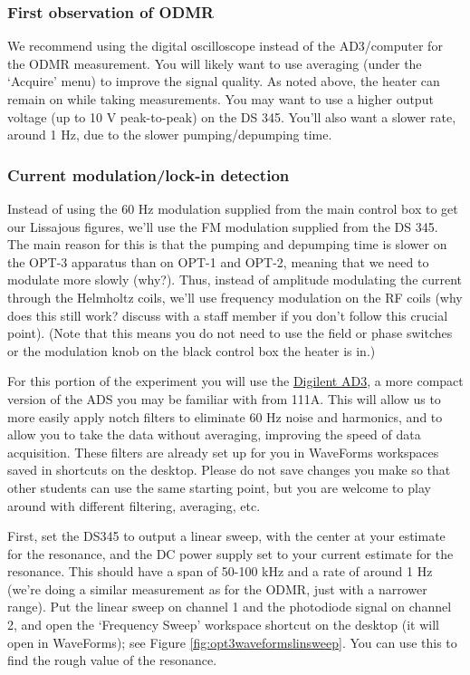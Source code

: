 \documentclass{../lab}
\begin{document}
\subsubsection{First observation of ODMR}

We recommend using the digital oscilloscope instead of the AD3/computer for the ODMR measurement. You will likely want to use averaging (under the `Acquire' menu) to improve the signal quality. As noted above, the heater can remain on while taking measurements. You may want to use a higher output voltage (up to 10 V peak-to-peak) on the DS 345. You'll also want a slower rate, around 1 Hz, due to the slower pumping/depumping time.

\subsubsection{Current modulation/lock-in detection}

Instead of using the 60 Hz modulation supplied from the main control box to get our Lissajous figures, we'll use the FM modulation supplied from the DS 345. The main reason for this is that the pumping and depumping time is slower on the OPT-3 apparatus than on OPT-1 and OPT-2, meaning that we need to modulate more slowly (why?). Thus, instead of amplitude modulating the current through the Helmholtz coils, we'll use frequency modulation on the RF coils (why does this still work? discuss with a staff member if you don't follow this crucial point). (Note that this means you do not need to use the field or phase switches or the modulation knob on the black control box the heater is in.)

For this portion of the experiment you will use the \href{https://digilent.com/shop/analog-discovery-3/}{Digilent AD3}, a more compact version of the ADS you may be familiar with from 111A. This will allow us to more easily apply notch filters to eliminate 60 Hz noise and harmonics, and to allow you to take the data without averaging, improving the speed of data acquisition. These filters are already set up for you in WaveForms workspaces saved in shortcuts on the desktop. Please do not save changes you make so that other students can use the same starting point, but you are welcome to play around with different filtering, averaging, etc.

First, set the DS345 to output a linear sweep, with the center at your estimate for the resonance, and the DC power supply set to your current estimate for the resonance. This should have a span of 50-100 kHz and a rate of around 1 Hz (we're doing a similar measurement as for the ODMR, just with a narrower range). Put the linear sweep on channel 1 and the photodiode signal on channel 2, and open the `Frequency Sweep' workspace shortcut on the desktop (it will open in WaveForms); see Figure \ref{fig:opt3waveformslinsweep}. You can use this to find the rough value of the resonance.
\end{document}
